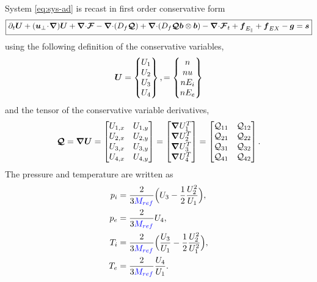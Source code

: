\documentclass[a4paper,10pt]{article}
\newcommand{\bm}[1]{\text{\boldmath$#1$\unboldmath}}
\newcommand{\scal}{\! \cdot \! }
\newcommand{\bu}{\bm{u}}
\newcommand{\Div}{{\bm{\nabla}\cdot}}
\newcommand{\Grad}{\bm{\nabla}}
\renewcommand{\b}{\bm{b}}
\newcommand{\DiscFunc}[1]{\bm{#1}}
\newcommand{\SecOrdTens}[1]{\bm{\mathcal{#1}}}
\renewcommand{\u}{\DiscFunc{U}}
\newcommand{\F}{\SecOrdTens{F}}
\newcommand{\G}{\SecOrdTens{Q}}
\newcommand{\nd}[1]{{\color{blue} #1\color{black}}} %
\def\Mref{\nd{M_{ref}}}
\begin{document}
System \eqref{eq:sys-ad} is recast in first order conservative form 
\begin{equation}\label{eq:sys-cons}
\boxed{
 \partial_t \u+(\bu_\bot\scal\Grad)\u+ \Div \F - \Div(D_f \G)+\Div (D_f \G\b \otimes \b)-\Div \F_t + \bm{f}_{E_{\parallel}}+ \bm{f}_{EX}-\bm{g} = \bm{s}
 }
\end{equation}
using the following definition of the conservative variables,
\begin{equation*}
 \u = \begin{Bmatrix}
                     U_1\\
                     U_2\\
                     U_3\\
                     U_4
       \end{Bmatrix}, = 
       \begin{Bmatrix}
                     n  \\
                     nu \\
                     nE_i\\
                     nE_e
       \end{Bmatrix}
\end{equation*}
and the tensor of the conservative variable derivatives,
\[
\G = \Grad \u
=\begin{bmatrix}
 U_{1,x} & U_{1,y}\\
 U_{2,x} & U_{2,y}\\
 U_{3,x} & U_{3,y}\\
 U_{4,x} & U_{4,y}
\end{bmatrix}=
\begin{bmatrix}
 \Grad U_1^T\\
 \Grad U_2^T\\
 \Grad U_3^T\\
 \Grad U_4^T
\end{bmatrix}=
\begin{bmatrix}
 \mathcal{Q}_{11} & \mathcal{Q}_{12} \\
 \mathcal{Q}_{21} & \mathcal{Q}_{22} \\
 \mathcal{Q}_{31} & \mathcal{Q}_{32} \\
 \mathcal{Q}_{41} & \mathcal{Q}_{42} 
\end{bmatrix}
.
\]
The pressure and temperature are written as 
\begin{align*}
        p_i&=\frac{2}{3 \Mref }\Big(U_3 -\frac{1}{2}\frac{U_2^2}{U_1}\Big),\\
        p_e&=\frac{2}{3 \Mref } U_4,\\
        T_i&=\frac{2}{3 \Mref }\Big(\frac{U_3}{U_1}- \frac{1}{2}\frac{U_2^2}{U_1^2}\Big),\\
        T_e&=\frac{2}{3 \Mref } \frac{U_4}{U_1}.
\end{align*}
\end{document}
